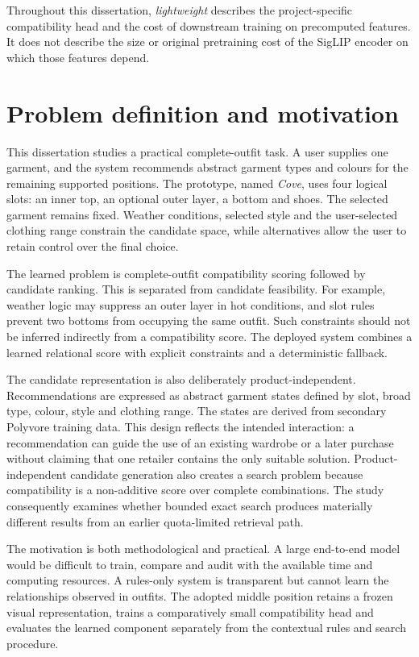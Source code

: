 Throughout this dissertation, \emph{lightweight} describes the project-specific
compatibility head and the cost of downstream training on precomputed features.
It does not describe the size or original pretraining cost of the SigLIP
encoder on which those features depend.

\section{Problem definition and motivation}

This dissertation studies a practical complete-outfit task. A user supplies
one garment, and the system recommends abstract garment types and colours for
the remaining supported positions. The prototype, named \emph{Cove}, uses four
logical slots: an inner top, an optional outer layer, a bottom and shoes. The
selected garment remains fixed. Weather conditions, selected style and the
user-selected clothing range constrain the candidate space, while alternatives
allow the user to retain control over the final choice.

The learned problem is complete-outfit compatibility scoring followed by
candidate ranking. This is separated from candidate feasibility. For example,
weather logic may suppress an outer layer in hot conditions, and slot rules
prevent two bottoms from occupying the same outfit. Such constraints should
not be inferred indirectly from a compatibility score. The deployed system
combines a learned relational score with explicit constraints and a
deterministic fallback.

The candidate representation is also deliberately product-independent.
Recommendations are expressed as abstract garment states defined by slot,
broad type, colour, style and clothing range. The states are derived from
secondary Polyvore training data. This design reflects the intended
interaction: a recommendation can
guide the use of an existing wardrobe or a later purchase without claiming
that one retailer contains the only suitable solution. Product-independent
candidate generation also creates a search problem because compatibility is a
non-additive score over complete combinations. The study consequently examines
whether bounded exact search produces materially different results from an
earlier quota-limited retrieval path.

The motivation is both methodological and practical. A large end-to-end model
would be difficult to train, compare and audit with the available time and
computing resources. A rules-only system is transparent but cannot learn the
relationships observed in outfits. The adopted middle position retains a
frozen visual representation, trains a comparatively small compatibility head
and evaluates the learned component separately from the contextual rules and
search procedure.

